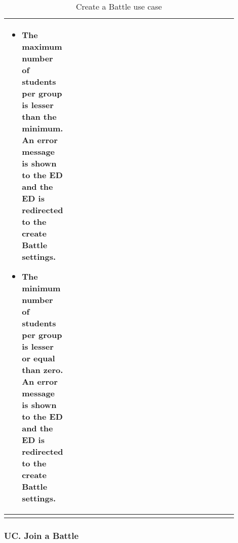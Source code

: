 \begin{center}
\begin{longtable}{|l|p{0.9\linewidth}|}
\begin{itemize}
                \item The maximum number of students per group is lesser than the minimum.  An error message is shown to the ED and the ED is redirected to the create Battle settings.
                \item The minimum number of students per group is lesser or equal than zero.  An error message is shown to the ED and the ED is redirected to the create Battle settings.    
        \end{itemize}    \\
        \hline
        \caption{Create a Battle use case}
        \label{tab: create_a_Battle_use_case}
    \end{longtable}
\end{center}

\subsubsection*{UC\cuc . Join a Battle}
